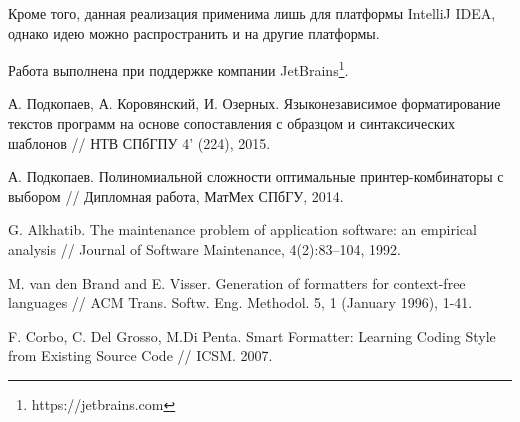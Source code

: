 \documentclass[conference]{IEEEtran}
\begin{document}
Кроме того, данная реализация применима лишь для платформы IntelliJ IDEA, однако идею можно распространить и на другие платформы.

Работа выполнена при поддержке компании JetBrains\footnote{https://jetbrains.com}.

\nocite{*}


\begin{thebibliography}{4}

  А. Подкопаев, А. Коровянский, И. Озерных.
  Языконезависимое форматирование текстов программ
  на основе сопоставления с образцом и синтаксических шаблонов
  // НТВ СПбГПУ 4' (224), 2015.

  А. Подкопаев. Полиномиальной сложности оптимальные принтер-комбинаторы с выбором
  // Дипломная работа, МатМех СПбГУ, 2014.

  G. Alkhatib.
  The maintenance problem of application software:
an empirical analysis //
  Journal of Software Maintenance, 4(2):83–104, 1992.
  
 M. van den Brand and E. Visser.
Generation of formatters for context-free languages //
ACM Trans. Softw. Eng. Methodol. 5, 1 (January 1996), 1-41.

 F. Corbo, C. Del Grosso, M.Di Penta.
Smart Formatter: Learning Coding Style from Existing Source Code //
ICSM. 2007.

\end{thebibliography}
\end{document}
